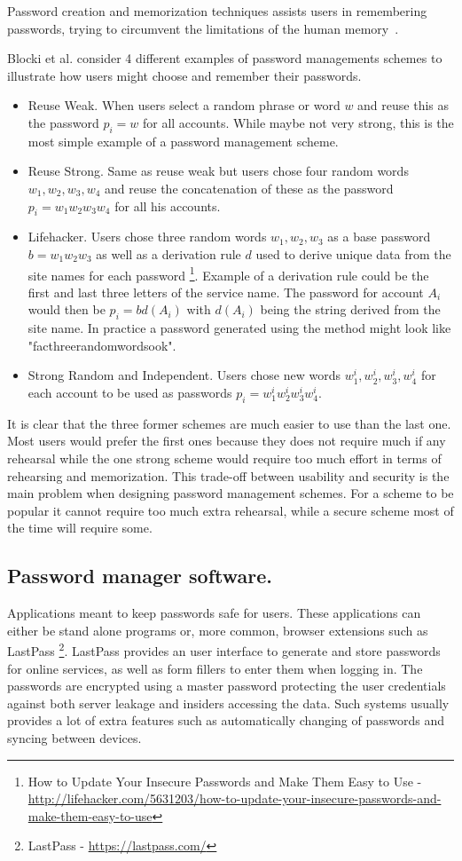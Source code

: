 Password creation and memorization techniques assists users in remembering passwords, trying to circumvent the limitations of the human memory~\cite{human-memory}. 
\par Blocki et al. \cite{naturally-rehearsing} consider 4 different examples of password managements schemes to illustrate how users might choose and remember their passwords.
\begin{itemize}
    \item{ Reuse Weak. } When users select a random phrase or word $w$ and reuse this as the password $p_i=w$ for all accounts. While maybe not very strong, this is the most simple example of a password management scheme.
    \item{ Reuse Strong. } Same as reuse weak but users chose four random words $w_1,w_2,w_3,w_4$ and reuse the concatenation of these as the password $p_i = w_1w_2w_3w_4$ for all his accounts.
    \item{Lifehacker.} Users chose three random words $w_1, w_2, w_3$ as a base password $b=w_1w_2w_3$ as well as a derivation rule $d$ used to derive unique data from the site names for each password \footnote{How to Update Your Insecure Passwords and Make Them Easy to Use - \url{http://lifehacker.com/5631203/how-to-update-your-insecure-passwords-and-make-them-easy-to-use}}. Example of a derivation rule could be the first and last three letters of the service name. The password for account $A_i$ would then be $p_i = b d(A_i)$ with $d(A_i)$ being the string derived from the site name. In practice a password generated using the method might look like "facthreerandomwordsook". 
    \item{Strong Random and Independent.} Users chose new words $w^i_1, w^i_2, w^i_3, w^i_4$ for each account to be used as passwords $p_i = w^i_1w^i_2w^i_3w^i_4$.
\end{itemize}
It is clear that the three former schemes are much easier to use than the last one. Most users would prefer the first ones because they does not require much if any rehearsal while the one strong scheme would require too much effort in terms of rehearsing and memorization. This trade-off between usability and security is the main problem when designing password management schemes. For a scheme to be popular it cannot require too much extra rehearsal, while a secure scheme most of the time will require some.



\subsection{Password manager software.} \label{subsec:pms}
Applications meant to keep passwords safe for users. These applications can either be stand alone programs or, more common, browser extensions such as LastPass \footnote{LastPass - \url{https://lastpass.com/}}. LastPass provides an user interface to generate and store passwords for online services, as well as form fillers to enter them when logging in. The passwords are encrypted using a master password protecting the user credentials against both server leakage and insiders accessing the data. Such systems usually provides a lot of extra features such as automatically changing of passwords and syncing between devices. 

